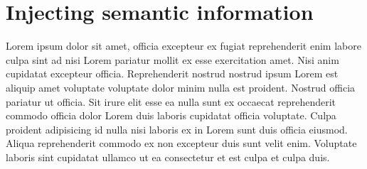 \chapter{Injecting semantic information}
\label{ch:injecting-semantic-information}


Lorem ipsum dolor sit amet, officia excepteur ex fugiat reprehenderit enim
labore culpa sint ad nisi Lorem pariatur mollit ex esse exercitation amet. Nisi
anim cupidatat excepteur officia. Reprehenderit nostrud nostrud ipsum Lorem est
aliquip amet voluptate voluptate dolor minim nulla est proident. Nostrud
officia pariatur ut officia. Sit irure elit esse ea nulla sunt ex occaecat
reprehenderit commodo officia dolor Lorem duis laboris cupidatat officia
voluptate. Culpa proident adipisicing id nulla nisi laboris ex in Lorem sunt
duis officia eiusmod. Aliqua reprehenderit commodo ex non excepteur duis sunt
velit enim. Voluptate laboris sint cupidatat ullamco ut ea consectetur et est
culpa et culpa duis.
